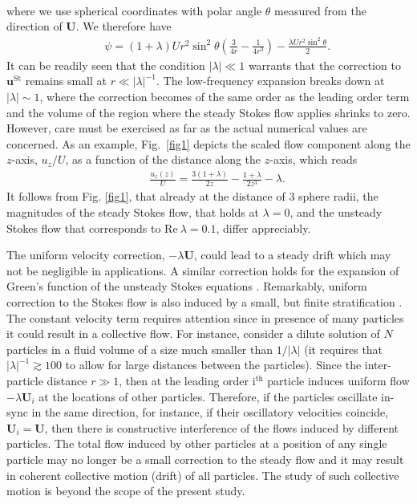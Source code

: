 \documentclass[aps,prx,twocolumn,amsmath,amssymb,amsfonts]{revtex4-2}
\newcommand{\rRe}{\mathrm{Re}}
\begin{document}
{\begin{eqnarray}
\end{eqnarray}
where we use spherical coordinates with polar angle $\theta$ measured from the direction of $\bm U$. We therefore have
\begin{eqnarray}&&\!\!\!\!\!\!\!\!
\psi=(1\!+\!\lambda) Ur^2\sin^2\theta\left(\frac{3}{4r}-\frac{1}{4r^3}\right)-\frac{\lambda U r^2 \sin^2\theta}{2}.
\end{eqnarray}
It can be readily seen that the condition $|\lambda|\ll 1$ warrants that the correction to $\bm u^\mathrm{St}$ remains small at $r\ll |\lambda|^{-1}$. The low-frequency expansion breaks down at $|\lambda|\sim 1$, where the correction becomes of the same order as the leading order term and the volume of the region where the steady Stokes flow applies shrinks to zero. However, care must be exercised as far as the actual numerical values are concerned. As an example, Fig.~\ref{fig1} depicts the scaled flow component along the $z$-axis, $u_z/U$, as a function of the distance along the $z$-axis, which reads
\begin{eqnarray}&&
\frac{u_z(z)}{U}\!=\frac{3(1\!+\!\lambda)}{2z}-\frac{1\!+\!\lambda}{2z^3}-\lambda.
\end{eqnarray}
It follows from Fig. \ref{fig1}, that already at the distance of $3$ sphere radii, the magnitudes of the steady Stokes flow, that holds at $\lambda\!=\!0$, and the unsteady Stokes flow that corresponds to $\rRe\ \lambda\!=\!0.1$, differ appreciably.

The uniform velocity correction, $-\lambda \bm U$, could lead to a steady drift which may not be negligible in applications. A similar correction holds for the expansion of Green's function of the unsteady Stokes equations \cite{kim}. Remarkably, uniform correction to the Stokes flow is also induced by a small, but finite stratification \cite{fl}. The constant velocity term requires attention since in presence of many particles it could result in a collective flow. For instance, consider a dilute solution of $N$ particles in a fluid volume of a size much smaller than $1/|\lambda|$ (it requires that $|\lambda|^{-1}\gtrsim 100$ to allow for large distances between the particles). Since the inter-particle distance $r\gg 1$, then at the leading order i$^\mathrm{th}$ particle induces uniform flow $-\lambda \bm U_i$ at the locations of other particles. Therefore, if the particles oscillate in-sync in the same direction, for instance, if their oscillatory velocities coincide, $\bm U_i=\bm U$, then there is constructive interference of the flows induced by different particles. The total flow induced by other particles at a position of any single particle may no longer be a small correction to the steady flow and it may result in coherent collective motion (drift) of all particles. The study of such collective motion is beyond the scope of the present study.


}
\end{document}
